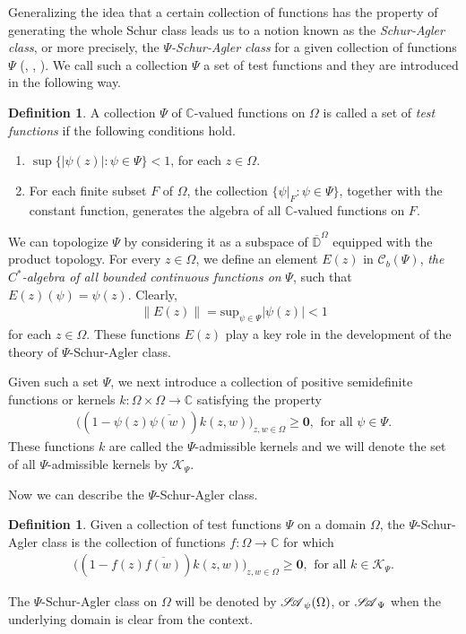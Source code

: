 \documentclass[12pt]{amsart}
\theoremstyle{definition}
\newtheorem{definition}[theorem]{Definition}
\numberwithin{equation}{section}
\newcommand{\SA}{\mathscr{S\mspace{-5mu}A}}
\begin{document}
Generalizing the idea that a certain collection of functions has the property of generating the whole Schur class leads us to a notion known as the \textit{Schur-Agler class}, or more precisely, the \textit{$\Psi$-Schur-Agler class} for a given collection of functions $\Psi$ (\cite{B_H}, \cite{BhatBisCha}, \cite{D-M}). We call such a collection $\Psi$ a set of test functions and they are introduced in the following way.
\begin{definition}
	A collection $\Psi$ of $\mathbb{C}$-valued functions on $\Omega$ is called a set of \textit{test functions} if the following conditions hold.
	\begin{enumerate}
		\item $\sup\{|\psi(z)|:\psi\in \Psi\}<1$, for each $z\in \Omega$.
		\item For each finite subset $F$ of $\Omega$, the collection $\{\psi |_F:\psi\in \Psi\}$, together with the constant function, generates the algebra of all $\mathbb{C}$-valued functions on $F$.
	\end{enumerate}
\end{definition}

We can topologize $\Psi$ by considering it as a subspace of $\overline{\mathbb{D}}^\Omega$ equipped with the product topology. For every $z\in \Omega$, we define an element $E(z)$ in $\mathcal{C}_b(\Psi)$, {\em the $C^*$-algebra of all bounded continuous functions on} $\Psi$, such that $E(z)(\psi)=\psi(z)$. Clearly,
\begin{align}\label{NormOfEz}
	\| E(z)\|= \text{sup}_{\psi\in \Psi} |\psi(z)|<1
\end{align}
for each $z\in \Omega$. These functions $E(z)$ play a key role in the development of the theory of $\Psi$-Schur-Agler class.

Given such a set $\Psi$, we next introduce a collection of positive semidefinite functions or kernels $k:\Omega\times \Omega\rightarrow \mathbb{C}$ satisfying the property
\begin{align*}
	\big((1-\psi(z)\overline{\psi(w)})k(z,w)\big)_{z,w\in \Omega}\geq \mathbf{0},\,\ \text{for all}\,\, \psi\in \Psi.
\end{align*}
These functions $k$ are called the $\Psi$-admissible kernels and we will denote the set of all $\Psi$-admissible kernels by $\mathcal{K}_\Psi$.

Now we can describe the $\Psi$-Schur-Agler class. 
\begin{definition}
	Given a collection of test functions $\Psi$ on a domain $\Omega$, the $\Psi$-Schur-Agler class is the collection of functions $f:\Omega\rightarrow \mathbb{C}$ for which
	\begin{align*}
		\big((1-f(z)\overline{f(w)})k(z,w)\big)_{z,w\in \Omega}\geq \mathbf{0},\,\ \text{for all}\,\, k\in\mathcal{K}_\Psi.
	\end{align*}
\end{definition}
The $\Psi$-Schur-Agler class on $\Omega$ will be denoted by $\SA_\psi(\Omega)$, or $\SA_\Psi$ when the underlying domain is clear from the context.
\end{document}
